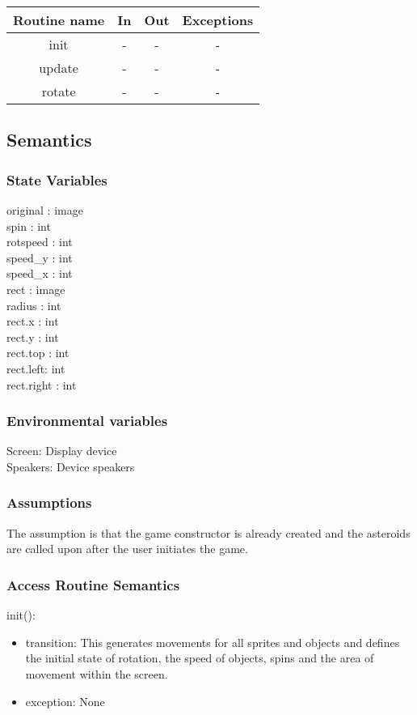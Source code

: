 \documentclass[12pt, titlepage]{article}
\begin{document}
\begin{tabular}{| c | c | c | c |}
\hline
\textbf{Routine name} & \textbf{In} & \textbf{Out} & \textbf{Exceptions}\\
\hline
init & - &  - & -  \\
\hline
update & -  & - & -\\
\hline
rotate & - & - & -\\
\hline
\end{tabular}

\subsection {Semantics}

\subsubsection {State Variables}
original : image
\\spin : int
\\rotspeed : int
\\speed\_y : int
\\speed\_x : int
\\rect : image
\\radius : int
\\rect.x : int
\\rect.y : int
\\rect.top : int
\\rect.left: int
\\rect.right : int

\subsubsection {Environmental variables}
Screen: Display device
\\Speakers: Device speakers 

\subsubsection {Assumptions}
The assumption is that the game constructor is already created and the asteroids are called upon after the user initiates the game. 

\subsubsection {Access Routine Semantics}

\noindent init():
\begin{itemize}
\item transition: This generates movements for all sprites and objects and defines the initial state of rotation, the speed of objects, spins and the area of movement within the screen. 
\item exception: None
\end{itemize}
\end{document}
